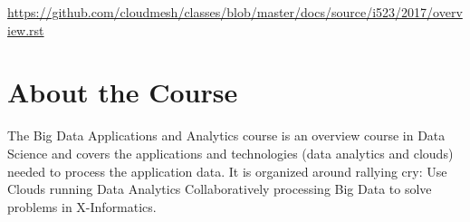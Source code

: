 \begin{fileremark}\url{https://github.com/cloudmesh/classes/blob/master/docs/source/i523/2017/overview.rst}\end{fileremark}
\section{About the Course}\label{about-the-course}

The Big Data Applications and Analytics course is an overview course in
Data Science and covers the applications and technologies (data
analytics and clouds) needed to process the application data. It is
organized around rallying cry: Use Clouds running Data Analytics
Collaboratively processing Big Data to solve problems in X-Informatics.
